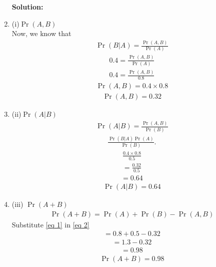 \documentclass{article}
\newcommand{\solution}{\noindent \textbf{Solution: }}
\providecommand{\pr}[1]{\ensuremath{\Pr\left(#1\right)}}
\begin{document}
\begin{enumerate}[label=13.\arabic{enumi}.\arabic{enumii}]
\solution
\item (i)$\pr{A,B}$
 \\
  Now, we know that
 \begin{align}
\pr{B \vert A}= \frac{\pr{A , B}}{\pr{A}}
 \end{align}
 \begin{align}
 0.4=\frac{\pr{A, B}}{\pr{A}}
 \end{align}
 \begin{align}
 0.4=\frac{\pr{A, B}}{0.8}
 \end{align}
 \begin{align}
 \pr{A,B}=0.4 \times 0.8
 \end{align}
 \begin{align}
 \pr{A,B}=0.32
 \label{eq 1}
 \end{align}
 \item
 (ii)$\pr{A \vert B}$
 \begin{align}
 \pr{A \vert B}= \frac{\pr{A,B}}{\pr{B}}
 \end{align}
 \begin{align}
 \frac{\pr{ B \vert A}\pr{A}}{\pr{B}}.
 \end{align}
 \begin{align}
  \frac{0.4 \times 0.8}{0.5}
 \end{align}
 \begin{align}
 = \frac{0.32}{0.5}
 \end{align}
  \begin{align}
 = 0.64
 \end{align}
  \begin{align}
\pr{A \vert B} = 0.64
 \end{align}
 \item
 (iii) $\pr{A+B}$
 \begin{align}
 \pr{A+B}= \pr{A}+\pr{B}-\pr{A, B} \label{eq 2}
 \end{align}
 Substitute \eqref{eq 1}  in \eqref{eq 2}
 \begin{align}
 =0.8+0.5-0.32
 \end{align}
 \begin{align}
 =1.3-0.32
 \end{align}
 \begin{align}
 = 0.98
 \end{align}
 \begin{align}
 \pr{A+B}=0.98
 \end{align}
\end{enumerate}
\end{document}
